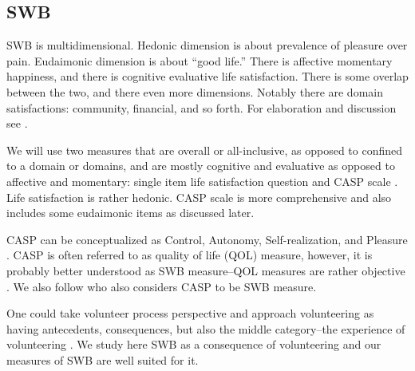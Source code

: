 \documentclass[10pt, letterpaper]{article}
\begin{document}
\begin{spacing}{1.4}
\section*{SWB} 

SWB is multidimensional. Hedonic dimension is about prevalence of pleasure over
pain. Eudaimonic dimension is about ``good life.'' There is affective momentary
happiness, and there is cognitive evaluative life satisfaction. There is some
overlap between the two, and there even more dimensions. Notably there are domain satisfactions:
community, financial, and so forth. For elaboration and discussion see \citet{diener09,diener04s,veenhoven08,kahneman99,campbell76etal}.

We will use two measures that are overall or all-inclusive, as opposed to
confined to a domain or domains, and are mostly cognitive and evaluative
as opposed to affective and momentary: single item life satisfaction question
and CASP scale \citep{hyde03,hyde15}. Life satisfaction is rather hedonic. CASP
scale is more comprehensive and also includes some eudaimonic items as discussed later.

CASP can be conceptualized as Control, Autonomy, Self-realization, and Pleasure \citep{hyde03,hyde15}.
CASP is often referred to as quality of life (QOL) measure, however, it is probably better understood as SWB measure--QOL measures are rather
objective \citep{aok13liavbility,aok-swbLivability18}. We also follow
\citet{vanhoutte12,vanhoutte14} who also considers CASP to be SWB measure.

One could take volunteer process perspective and approach volunteering
as having antecedents, consequences, but also the middle category--the
experience of volunteering \citep{wilson12B}. We study here SWB as a consequence
of volunteering and our measures of SWB are well suited for it.




\end{spacing}
\end{document}
